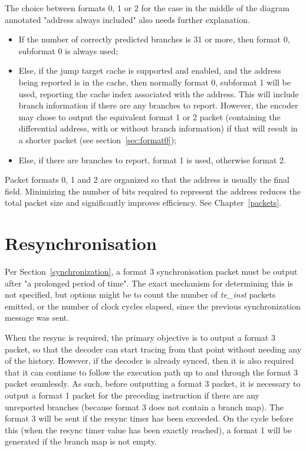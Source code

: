 The choice between formats 0, 1 or 2 for the case in the middle of the diagram annotated "address always included"
also needs further explanation.  

\begin{itemize}
  \item If the number of correctly predicted branches is 31 or more, then format 0, subformat 0 is
    always used;
  \item Else, if the jump target cache is supported and enabled, and the address being reported is in the cache,
    then normally format 0, subformat 1 will be used, reporting the cache index associated with the address.  
    This will include branch information if there are any branches to report.  
    However, the encoder may chose to output the equivalent format 1 or 2 packet (containing the differential 
    address, with or without branch information) if that will result in a shorter packet 
    (see section~\ref{sec:format0});
  \item Else, if there are branches to report, format 1 is used, otherwise format 2.
\end{itemize}


Packet formats 0, 1 and 2 are organized so that the address is usually the final field.  Minimizing the 
number of bits required to represent the address reduces the total packet size and significantly
improves efficiency.  See Chapter~\ref{packets}.

\section{Resynchronisation} \label{sec:resync}

Per Section~\ref{synchronization}, a format 3 synchronisation packet must be output after "a prolonged
period of time". The exact mechanism for
determining this is not specified, but options might be to count the number of \textit{te\_inst} packets emitted, 
or the number of clock cycles elapsed, since the previous synchronization message was sent.

When the resync is required, the primary objective is to output a format 3 packet, so that the decoder can 
start tracing from that point without needing any of the history.  However, if the decoder is already synced, 
then it is also required that it can continue to follow the execution path up to and through the format 3 packet 
seamlessly.  As such, before outputting a format 3 packet, it is necessary to output a format 1 packet for the 
preceding instruction if there are any unreported branches (because format 3 does not contain a branch map).  
The format 3 will be sent if the resync timer has been exceeded.  On the cycle before this (when the resync timer 
value has been exactly reached), a format 1 will be generated if the branch map is not empty.

